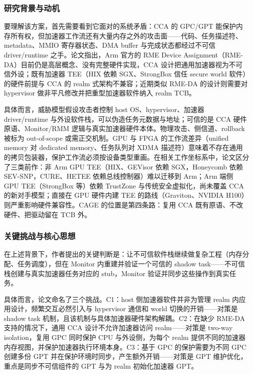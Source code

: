 \documentclass[11pt]{ctexart}
\begin{document}
\subsubsection{研究背景与动机}
要理解该方案，首先需要看到它面对的系统矛盾：CCA 的 GPC/GPT 能保护内存所有权，但加速器工作流还有大量内存之外的攻击面——代码、任务描述符、metadata、MMIO 寄存器状态、DMA buffer 与完成状态都经过不可信 driver/runtime 之手。论文指出，Arm 官方的 RME Device Assignment（RME-DA）目前仍是高层概念、没有完整硬件实现，CCA 设计把通用加速器视为不可信外设；既有加速器 TEE（HIX 依赖 SGX、StrongBox 信任 secure world 软件）的硬件前提与 CCA 的 realm 式架构不兼容；近期类似 RME-DA 的设计则需要对 hypervisor 做非平凡修改并把重型加速器软件纳入 realm TCB。\par
具体而言，威胁模型假设攻击者控制 host OS、hypervisor、加速器 driver/runtime 与外设软件栈，可以伪造任务元数据与地址；可信的是 CCA 硬件原语、Monitor/RMM 逻辑与真实加速器硬件本体。物理攻击、侧信道、rollback 被标为 out-of-scope 或需正交机制。GPU 与 FPGA 的工作流差异（unified memory 对 dedicated memory、任务队列对 XDMA 描述符）意味着不存在通用的拷贝包装器，保护工作流必须按设备类型重画。在相关工作坐标系中，论文区分了三类前作：非 Arm GPU TEE（HIX、GEVisor 依赖 SGX，Honeycomb 依赖 SEV-SNP，CURE、HETEE 依赖总线控制器）难以迁移到 Arm；Arm 端侧 GPU TEE（StrongBox 等）依赖 TrustZone 与传统安全虚拟化，尚未覆盖 CCA 的新对手模型；直接在 GPU 硬件内建 TEE 的路线（Graviton、NVIDIA H100）则严重影响硬件兼容性。CAGE 的位置是第四条路：复用 CCA 既有原语、不改硬件、把驱动留在 TCB 外。\par
\subsubsection{关键挑战与核心思想}
在上述背景下，作者提出的关键判断是：让不可信软件栈继续做复杂工程（内存分配、任务调度），但在 Monitor 内重建并验证一个可信的 shadow task——不可信栈创建与真实加速器任务对应的 stub，Monitor 验证并同步这些操作到真实任务。\par
具体而言，论文命名了三个挑战。C1：host 侧加速器软件并非为管理 realm 内应用设计，频繁交互必然引入与 hypervisor 通信和 world 切换的开销——对策是 shadow task 机制，且该机制与具体加速器硬件架构解耦。C2：在缺少 RME-DA 支持的情况下，通用 CCA 设计不允许加速器访问 realm——对策是 two-way isolation，复用 GPC 同时保护 CPU 与外设侧，为每个 realm 提供不同的加速器内存视图，并保护加速器执行环境本身。C3：基于 GPC 的保护需要为不同 GPC 创建多份 GPT 并在保护环境时同步，产生额外开销——对策是 GPT 维护优化，重点是同步不可信组件的 GPT 与为 realm 初始化加速器 GPT。\par
\end{document}
